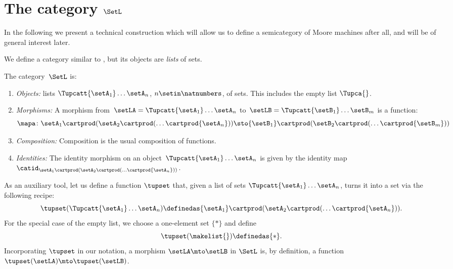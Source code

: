 
\section{The category $\SetL$}
\label{sec:SetL}

In the following we present a technical construction which will allow us to define a semicategory of Moore machines after all, and will be of general interest later. 

We define a category similar to \Set, but its objects are \emph{lists} of sets.

\begin{definition}
    \label{def:SetL}
    The category~$\SetL$ is:
    \begin{enumerate}
        \item \emph{Objects:} lists $\Tupcatt {\setA_1}  \dots {\setA_n}$, $n \setin \natnumbers$, of sets.
              This includes the empty list $\Tupca {}$.
        \item \emph{Morphisms:}
              A morphism from~$\setLA =\Tupcatt {\setA_1}  \dots {\setA_n}$ to~$\setLB = \Tupcatt {\setB_1} \dots {\setB_m}$ is a function:
              \begin{equation*}
                  \mapa\colon {\setA_1} \cartprod (\setA_2 \cartprod (\ldots \cartprod {\setA_n})) \sto {\setB_1} \cartprod (\setB_2 \cartprod (\ldots \cartprod {\setB_m}))
              \end{equation*}
        \item \emph{Composition:}
              Composition is the usual composition of functions.
        \item \emph{Identities:}
              The identity morphism on an object~$\Tupcatt {\setA_1} \dots {\setA_n}$ is given by the identity map~$\catid_{{\setA_1} \cartprod (\setA_2 \cartprod (\ldots \cartprod {\setA_n}))}$.
    \end{enumerate}
\end{definition}

As an auxiliary tool, let us define a function $\tupset$ that, given a list of sets $\Tupcatt {\setA_1}  \dots {\setA_n}$, turns it into a set via the following recipe: 
\begin{equation}
\tupset (\Tupcatt {\setA_1}  \dots {\setA_n}) \definedas {\setA_1} \cartprod (\setA_2 \cartprod (\ldots \cartprod {\setA_n})).
\end{equation}
For the special case of the empty list, we choose a one-element set $\{*\}$ and define
\begin{equation}
\tupset (\makelist{}) \definedas \{*\}.
\end{equation}
Incorporating $\tupset$ in our notation, a morphism $\setLA \mto \setLB$ in $\SetL$ is, by definition, a function $\tupset(\setLA) \mto \tupset(\setLB)$. 

